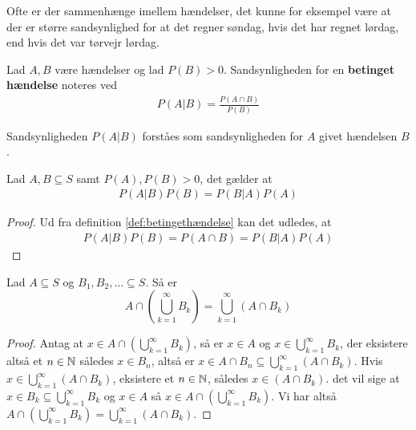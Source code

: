 Ofte er der sammenhænge imellem hændelser, det kunne for eksempel være at der er større sandsynlighed for at det regner søndag, hvis det har regnet lørdag, end hvis det var tørvejr lørdag.
\begin{defn}\label{def:betingethændelse} %
Lad $A, B$ være hændelser og lad $P(B)>0$. Sandsynligheden for en \textbf{betinget hændelse} noteres ved
\begin{align*}
    P(A|B)=\frac{P(A\cap B)}{P(B)}
\end{align*}
\end{defn}
Sandsynligheden $P(A|B)$ forståes som sandsynligheden for $A$ givet hændelsen $B$.

 
\begin{thm}\label{thm:bayesTheorem} %
Lad $A, B \subseteq S$ samt $P(A), P(B) > 0$, det gælder at
\begin{align*}
    P(A|B)P(B)=P(B|A)P(A)
\end{align*}
\end{thm}
\begin{proof}
Ud fra definition \ref{def:betingethændelse} kan det udledes, at
\begin{align*}
    P(A|B)P(B)=P(A\cap B)=P(B|A)P(A)
\end{align*}
\end{proof}

\begin{lem} \label{lem:DistributiveLawForInfiniteUnions}
Lad $A \subseteq S$ og $B_1, B_2, \ldots \subseteq S$. Så er 
\begin{equation*}
    A \cap \left( \bigcup^\infty_{k = 1} B_k \right) = \bigcup^\infty_{k = 1} (A \cap B_k)
\end{equation*}
\end{lem}
\begin{proof}
Antag at $x \in A \cap \left( \bigcup^\infty_{k = 1} B_k\right)$, så er $x \in A$ og $x \in \bigcup^\infty_{k = 1} B_k$, der eksistere altså et $n \in \mathbb{N}$ således $x \in B_n$, altså er $x \in A \cap B_n \subseteq \bigcup^\infty_{k = 1} (A \cap B_k)$. 
Hvis $x \in \bigcup^\infty_{k = 1} (A \cap B_k)$, eksistere et $n \in \mathbb{N}$, således $x \in (A \cap B_k)$. det vil sige at $x \in B_k \subseteq \bigcup^\infty_{k = 1} B_k$ og $x \in A$ så $x \in A \cap \left( \bigcup^\infty_{k = 1} B_k \right)$. Vi har altså $A \cap \left( \bigcup^\infty_{k = 1} B_k \right) = \bigcup^\infty_{k = 1} (A \cap B_k)$.
\end{proof}

